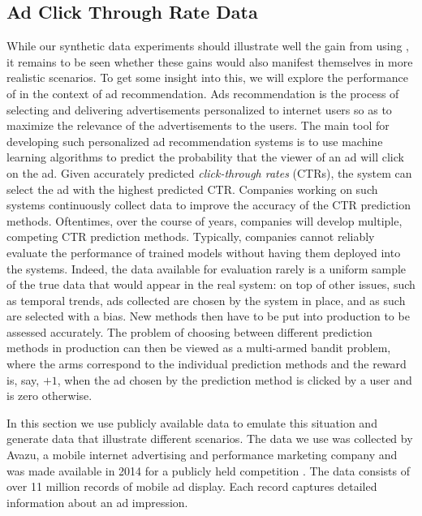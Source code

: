 \subsection{Ad Click Through Rate Data}\label{sec:exprealdata}
\newcommand{\oto}{\algoname}

 While our synthetic data experiments should illustrate well the gain from using \oto, it remains to be seen whether these gains would also manifest themselves in more realistic scenarios. 
To get some insight into this, we will explore the performance of \oto 
in the context of ad recommendation. Ads recommendation
is the process of selecting and delivering advertisements personalized to internet users so as to maximize the relevance of the advertisements to the users. The main tool for developing such personalized ad recommendation systems is to use machine learning algorithms to predict the probability that the viewer of an ad will click on the ad. Given accurately predicted \emph{click-through rates} (CTRs), the system can select the ad with the highest predicted CTR. Companies working on such systems continuously collect data to improve the accuracy of the CTR prediction methods. 
Oftentimes, over the course of years, companies will develop multiple, competing CTR prediction methods. Typically, companies cannot reliably evaluate the performance of trained models without having them deployed into the systems. Indeed, the data available for evaluation rarely is a uniform sample of the true data that would appear in the real system: on top of other issues, such as temporal trends, ads collected are chosen by the system in place, and as such are selected with a bias. New methods then have to be put into production to be assessed accurately. The problem of choosing between different prediction methods in production can then be viewed as a multi-armed bandit problem, where the arms correspond to the individual prediction methods and the reward is, say, $+1$, when the ad chosen by the prediction method is clicked by a user and is zero otherwise. 

In this section we use publicly available data to emulate this situation and generate data that illustrate different scenarios. The data we use was collected by Avazu, a mobile internet advertising and performance marketing company
 and was made available in 2014 for a publicly held competition \citep{avazu-ctr-prediction}.
The data consists of over 11 million records of mobile ad display. Each record captures detailed information about an ad impression. 
 
